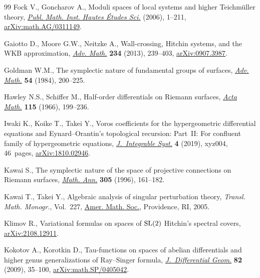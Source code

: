 \documentclass[pdftex]{sigma}
\numberwithin{equation}{section}
\theoremstyle{definition}
\begin{document}
\begin{thebibliography}{99}
Fock V., Goncharov A., Moduli spaces of local systems and higher
 {T}eichm\"uller theory, \href{https://doi.org/10.1007/s10240-006-0039-4}{\textit{Publ. Math. Inst. Hautes \'Etudes Sci.}}
 (2006), 1--211, \href{https://arxiv.org/abs/math.AG/0311149}{arXiv:math.AG/0311149}.

Gaiotto D., Moore G.W., Neitzke A., Wall-crossing, {H}itchin systems, and the
 {WKB} approximation, \href{https://doi.org/10.1016/j.aim.2012.09.027}{\textit{Adv. Math.}} \textbf{234} (2013), 239--403,
 \href{https://arxiv.org/abs/0907.3987}{arXiv:0907.3987}.

Goldman W.M., The symplectic nature of fundamental groups of surfaces,
 \href{https://doi.org/10.1016/0001-8708(84)90040-9}{\textit{Adv. Math.}} \textbf{54} (1984), 200--225.

Hawley N.S., Schiffer M., Half-order differentials on {R}iemann surfaces,
 \href{https://doi.org/10.1007/BF02392208}{\textit{Acta Math.}} \textbf{115} (1966), 199--236.

Iwaki K., Koike T., Takei Y., Voros coefficients for the hypergeometric
 differential equations and {E}ynard--{O}rantin's topological recursion:
 {P}art~{II}: {F}or confluent family of hypergeometric equations,
 \href{https://doi.org/10.1093/integr/xyz004}{\textit{J.~Integrable Syst.}} \textbf{4} (2019), xyz004, 46~pages,
 \href{https://arxiv.org/abs/1810.02946}{arXiv:1810.02946}.

Kawai S., The symplectic nature of the space of projective connections on
 {R}iemann surfaces, \href{https://doi.org/10.1007/BF01444216}{\textit{Math. Ann.}} \textbf{305} (1996), 161--182.

Kawai T., Takei Y., Algebraic analysis of singular perturbation theory,
 \textit{Transl. Math. Monogr.}, Vol.~227, \href{https://doi.org/10.1090/mmono/227}{Amer. Math. Soc.}, Providence, RI,
 2005.

Klimov R., Variational formulas on spaces of {${\rm SL}(2)$} {H}itchin's
 spectral covers, \href{https://arxiv.org/abs/2108.12911}{arXiv:2108.12911}.

Kokotov A., Korotkin D., Tau-functions on spaces of abelian differentials and
 higher genus generalizations of {R}ay--{S}inger formula,
 \href{https://doi.org/10.4310/jdg/1242134368}{\textit{J.~Differential Geom.}} \textbf{82} (2009), 35--100,
 \href{https://arxiv.org/abs/math.SP/0405042}{arXiv:math.SP/0405042}.


\end{thebibliography}
\end{document}
